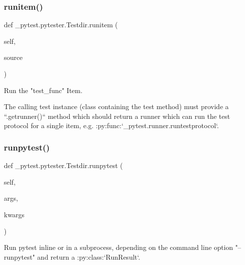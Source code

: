 \subsubsection{\texorpdfstring{runitem()}{runitem()}}
{\footnotesize\ttfamily def \+\_\+pytest.\+pytester.\+Testdir.\+runitem (\begin{DoxyParamCaption}\item[{}]{self,  }\item[{}]{source }\end{DoxyParamCaption})}

\begin{DoxyVerb}Run the "test_func" Item.

The calling test instance (class containing the test method) must
provide a ``.getrunner()`` method which should return a runner which
can run the test protocol for a single item, e.g.
:py:func:`_pytest.runner.runtestprotocol`.\end{DoxyVerb}
 \mbox{\label{class__pytest_1_1pytester_1_1_testdir_add6344e4fc783225edc046028ad0b6a5}} 
\subsubsection{\texorpdfstring{runpytest()}{runpytest()}}
{\footnotesize\ttfamily def \+\_\+pytest.\+pytester.\+Testdir.\+runpytest (\begin{DoxyParamCaption}\item[{}]{self,  }\item[{}]{args,  }\item[{}]{kwargs }\end{DoxyParamCaption})}

\begin{DoxyVerb}Run pytest inline or in a subprocess, depending on the command line
option "--runpytest" and return a :py:class:`RunResult`.\end{DoxyVerb}
 \mbox{\label{class__pytest_1_1pytester_1_1_testdir_a2cd927260d911e6989e75fa661b34bd8}} 
